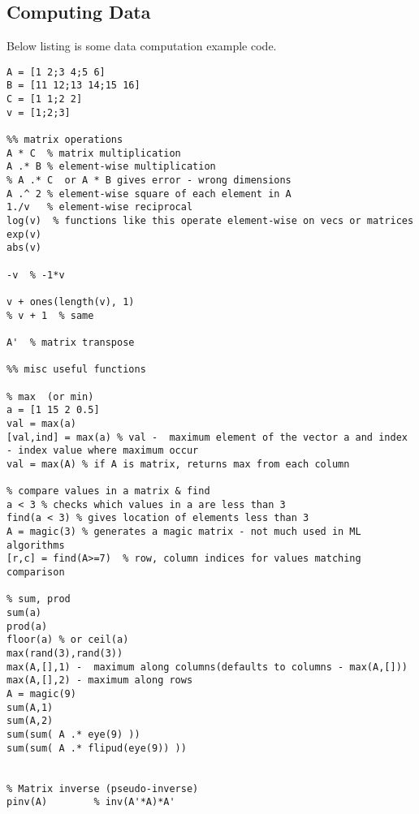 \subsection{Computing Data}
Below listing is some data computation example code.
\begin{lstlisting}[label=lst:dataComp, caption=Computing Data]
%% initialize variables
A = [1 2;3 4;5 6]
B = [11 12;13 14;15 16]
C = [1 1;2 2]
v = [1;2;3]

%% matrix operations
A * C  % matrix multiplication
A .* B % element-wise multiplication
% A .* C  or A * B gives error - wrong dimensions
A .^ 2 % element-wise square of each element in A
1./v   % element-wise reciprocal
log(v)  % functions like this operate element-wise on vecs or matrices 
exp(v)
abs(v)

-v  % -1*v

v + ones(length(v), 1)  
% v + 1  % same

A'  % matrix transpose

%% misc useful functions

% max  (or min)
a = [1 15 2 0.5]
val = max(a)
[val,ind] = max(a) % val -  maximum element of the vector a and index - index value where maximum occur
val = max(A) % if A is matrix, returns max from each column

% compare values in a matrix & find
a < 3 % checks which values in a are less than 3
find(a < 3) % gives location of elements less than 3
A = magic(3) % generates a magic matrix - not much used in ML algorithms
[r,c] = find(A>=7)  % row, column indices for values matching comparison

% sum, prod
sum(a)
prod(a)
floor(a) % or ceil(a)
max(rand(3),rand(3))
max(A,[],1) -  maximum along columns(defaults to columns - max(A,[]))
max(A,[],2) - maximum along rows
A = magic(9)
sum(A,1)
sum(A,2)
sum(sum( A .* eye(9) ))
sum(sum( A .* flipud(eye(9)) ))


% Matrix inverse (pseudo-inverse)
pinv(A)        % inv(A'*A)*A'
\end{lstlisting}


